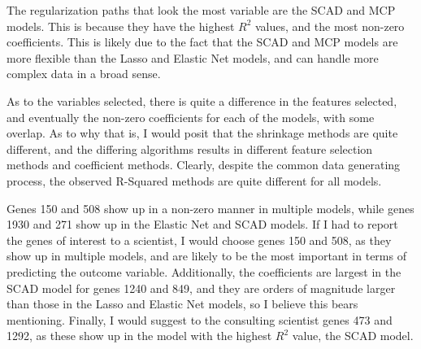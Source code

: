 \documentclass[12pt, letterpaper]{article}
\begin{document}
The regularization paths that look the most variable are the SCAD and MCP models. This is because they have the highest $R^2$ values, and the most non-zero coefficients. This is likely due to the fact that the SCAD and MCP models are more flexible than the Lasso and Elastic Net models, and can handle more complex data in a broad sense. 

As to the variables selected, there is quite a difference in the features selected, and eventually the non-zero coefficients for each of the models, with some overlap. As to why that is, I would posit that the shrinkage methods are quite different, and the differing algorithms results in different feature selection methods and coefficient methods. Clearly, despite the common data generating process, the observed R-Squared methods are quite different for all models. 

Genes 150 and 508 show up in a non-zero manner in multiple models, while genes 1930 and 271 show up in the Elastic Net and SCAD models. If I had to report the genes of interest to a scientist, I would choose genes 150 and 508, as they show up in multiple models, and are likely to be the most important in terms of predicting the outcome variable. Additionally, the coefficients are largest in the SCAD model for genes 1240 and 849, and they are orders of magnitude larger than those in the Lasso and Elastic Net models, so I believe this bears mentioning. Finally, I would suggest to the consulting scientist genes 473 and 1292, as these show up in the model with the highest $R^2$ value, the SCAD model. 
\end{document}
